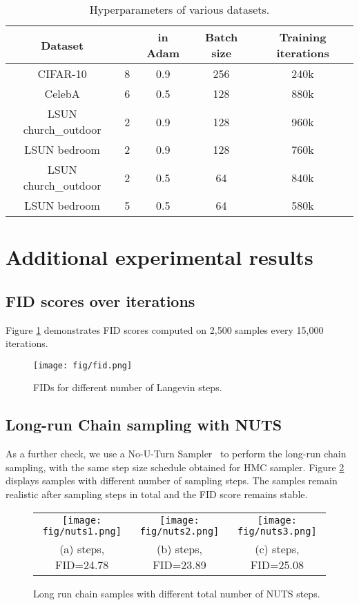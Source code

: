 \documentclass{article} \usepackage{iclr2021_conference,times}
\begin{document}
\begin{table}[ht]
    \centering
        \caption{Hyperparameters of various datasets.}
        \footnotesize
    \begin{tabular}{ccccc}
    \toprule
        Dataset &  &  in Adam & Batch size & Training iterations  \\
        \midrule
        CIFAR-10 & 8 & 0.9 & 256 & 240k \\
        CelebA & 6 & 0.5 & 128 & 880k \\
        LSUN church\_outdoor  & 2 & 0.9 & 128 & 960k \\
        LSUN bedroom  & 2 & 0.9 & 128 & 760k \\
        LSUN church\_outdoor  & 2 & 0.5 & 64 & 840k \\
        LSUN bedroom  & 5 & 0.5 & 64 & 580k \\
        \bottomrule
    \end{tabular}
    \label{tabl:hyper}
\end{table}
\section{Additional experimental results}
\subsection{FID scores over iterations} \label{app:fid}
Figure \ref{fig:fid} demonstrates FID scores computed on 2,500 samples every 15,000 iterations. 
 \begin{figure}[h]
 \centering
 \texttt{[image: fig/fid.png]} 
 \caption{FIDs for different number of Langevin steps.}
 \label{fig:fid}
 \end{figure}
\subsection{Long-run Chain sampling with NUTS} \label{app:long-run}
As a further check, we use a No-U-Turn Sampler~\citep{hoffman2014no} to perform the long-run chain sampling, with the same step size schedule obtained for HMC sampler. Figure \ref{fig: long-run2} displays samples with different number of sampling steps. The samples remain realistic after  sampling steps in total and the FID score remains stable. 
\begin{figure}[ht]
\begin{center}
\begin{tabular}{ccc}
	\texttt{[image: fig/nuts1.png]} &
\texttt{[image: fig/nuts2.png]} &
\texttt{[image: fig/nuts3.png]}\\
(a)  steps, FID=24.78 & (b)  steps, FID=23.89 & (c)  steps, FID=25.08
\end{tabular}
\end{center}
\caption{Long run chain samples with different total number of NUTS steps. }
\label{fig: long-run2}
\end{figure}
\end{document}
